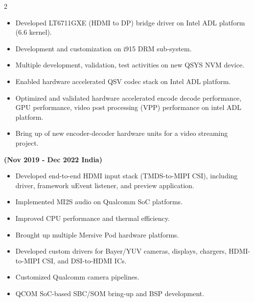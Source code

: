 \documentclass[10pt,a4paper,ragged2e,withhyper]{altacv}
\begin{document}
\begin{paracol}{2}


\begin{itemize}
    \item Developed LT6711GXE (HDMI to DP) bridge driver on Intel ADL platform (6.6 kernel).
    \item Development and customization on i915 DRM sub-system.
    \item Multiple development, validation, test activities on new QSYS NVM device.
\end{itemize}

\divider

\begin{itemize}
    \item Enabled hardware accelerated QSV codec stack on Intel ADL platform.
    \item Optimized and validated hardware accelerated encode decode performance, GPU performance, video post processing (VPP) performance on intel ADL platform.
    \item Bring up of new encoder-decoder hardware units for a video streaming project.
\end{itemize}

\divider

\hspace{0.25cm}\textbf{(Nov 2019 - Dec 2022 India)}
\begin{itemize}
    \item Developed end-to-end HDMI input stack (TMDS-to-MIPI CSI), including driver, framework uEvent listener, and preview application.
    \item Implemented MI2S audio on Qualcomm SoC platforms.
    \item Improved CPU performance and thermal efficiency.
    \item Brought up multiple Mersive Pod hardware platforms.
\end{itemize}

\divider

\begin{itemize}
    \item Developed custom drivers for Bayer/YUV cameras, displays, chargers, HDMI-to-MIPI CSI, and DSI-to-HDMI ICs.
    \item Customized Qualcomm camera pipelines.
    \item QCOM SoC-based SBC/SOM bring-up and BSP development.
\end{itemize}


\end{paracol}
\end{document}
